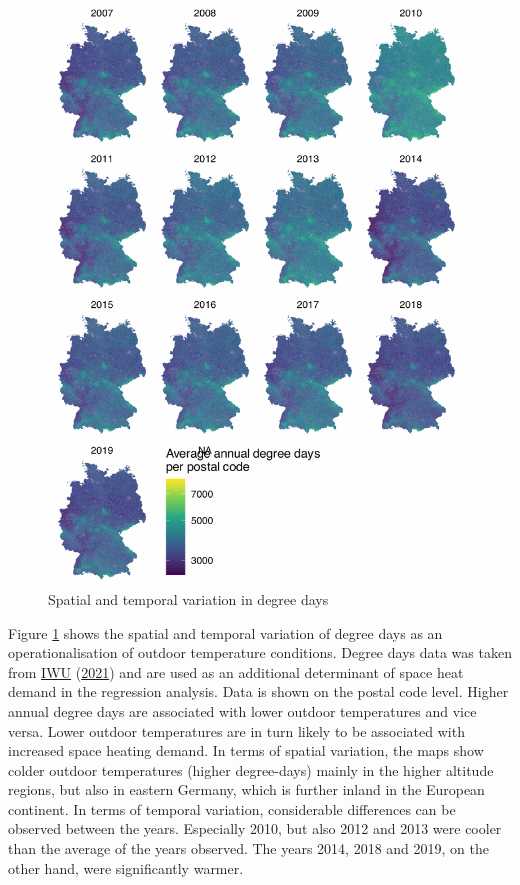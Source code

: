 \documentclass[12pt,twoside]{reedthesis}
\begin{document}
\singlespacing
\newpage
\begin{figure}

{\centering \includegraphics[width=0.72\linewidth]{figure/distribution_degree_days} 

}

\caption{Spatial and temporal variation in degree days}\label{fig:degree-days-distribution}
\end{figure}
\noindent
Figure \ref{fig:degree-days-distribution} shows the spatial and temporal variation of degree days as an operationalisation of outdoor temperature conditions. Degree days data was taken from \protect\hyperlink{ref-iwu21}{IWU} (\protect\hyperlink{ref-iwu21}{2021}) and are used as an additional determinant of space heat demand in the regression analysis. Data is shown on the postal code level. Higher annual degree days are associated with lower outdoor temperatures and vice versa. Lower outdoor temperatures are in turn likely to be associated with increased space heating demand. In terms of spatial variation, the maps show colder outdoor temperatures (higher degree-days) mainly in the higher altitude regions, but also in eastern Germany, which is further inland in the European continent. In terms of temporal variation, considerable differences can be observed between the years. Especially 2010, but also 2012 and 2013 were cooler than the average of the years observed. The years 2014, 2018 and 2019, on the other hand, were significantly warmer.
\end{document}
